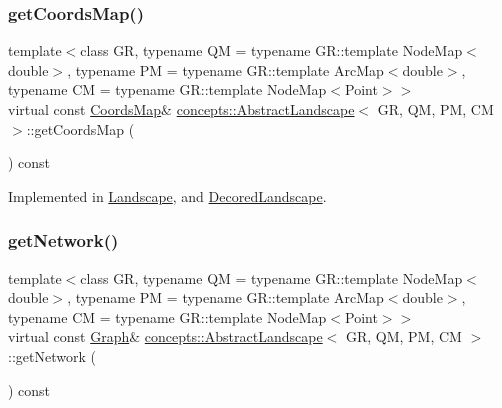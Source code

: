 \mbox{\label{classconcepts_1_1_abstract_landscape_a5005b0254f3c5aa0ed8505386fca92b3}} 
\subsubsection{\texorpdfstring{get\+Coords\+Map()}{getCoordsMap()}}
{\footnotesize\ttfamily template$<$class GR, typename QM = typename G\+R\+::template Node\+Map$<$double$>$, typename PM = typename G\+R\+::template Arc\+Map$<$double$>$, typename CM = typename G\+R\+::template Node\+Map$<$\+Point$>$$>$ \\
virtual const \hyperlink{classconcepts_1_1_abstract_landscape_a8432d7dff7edc5a5cbc524592b411f8a}{Coords\+Map}\& \hyperlink{classconcepts_1_1_abstract_landscape}{concepts\+::\+Abstract\+Landscape}$<$ GR, QM, PM, CM $>$\+::get\+Coords\+Map (\begin{DoxyParamCaption}{ }\end{DoxyParamCaption}) const\hspace{0.3cm}{\ttfamily [pure virtual]}}



Implemented in \hyperlink{class_landscape_ab6e4efb27be3f1870ce42656a5534d68}{Landscape}, and \hyperlink{class_decored_landscape_a66994174c58cad04d5fa75cb24ef2772}{Decored\+Landscape}.

\mbox{\label{classconcepts_1_1_abstract_landscape_a7ed478b62e37cad9a22bed3adedf07c5}} 
\subsubsection{\texorpdfstring{get\+Network()}{getNetwork()}}
{\footnotesize\ttfamily template$<$class GR, typename QM = typename G\+R\+::template Node\+Map$<$double$>$, typename PM = typename G\+R\+::template Arc\+Map$<$double$>$, typename CM = typename G\+R\+::template Node\+Map$<$\+Point$>$$>$ \\
virtual const \hyperlink{classconcepts_1_1_abstract_landscape_ab1988ca4ff36329c45af21e76046903d}{Graph}\& \hyperlink{classconcepts_1_1_abstract_landscape}{concepts\+::\+Abstract\+Landscape}$<$ GR, QM, PM, CM $>$\+::get\+Network (\begin{DoxyParamCaption}{ }\end{DoxyParamCaption}) const\hspace{0.3cm}{\ttfamily [pure virtual]}}



